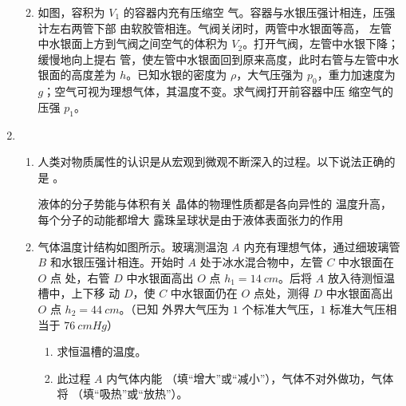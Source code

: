 \begin{enumerate}
\begin{enumerate}

\item 
如图，容积为 $ V_{1} $ 的容器内充有压缩空
气。容器与水银压强计相连，压强计左右两管下部
由软胶管相连。气阀关闭时，两管中水银面等高，
左管中水银面上方到气阀之间空气的体积为 $ V_{2} $。打开气阀，左管中水银下降；缓慢地向上提右
管，使左管中水银面回到原来高度，此时右管与左管中水银面的高度差为 $ h $。已知水银的密度为
$ \rho $，大气压强为 $ p_{0} $，重力加速度为 $ g $；空气可视为理想气体，其温度不变。求气阀打开前容器中压
缩空气的压强 $ p_{1} $。
\begin{figure}[h!]
	\flushright
	
\end{figure}


	
\end{enumerate}

\item 
{}
\begin{enumerate}
	\item
人类对物质属性的认识是从宏观到微观不断深入的过程。以下说法正确的是 \underlinegap 。	

\fourchoices
{液体的分子势能与体积有关}
{晶体的物理性质都是各向异性的}
{温度升高，每个分子的动能都增大}
{露珠呈球状是由于液体表面张力的作用}


\item 
气体温度计结构如图所示。玻璃测温泡 $ A $ 内充有理想气体，通过细玻璃管 $ B $
和水银压强计相连。开始时 $ A $ 处于冰水混合物中，左管 $ C $ 中水银面在 $ O $ 点
处，右管 $ D $ 中水银面高出 $ O $ 点 $ h_{1} =14 \ cm $。后将 $ A $ 放入待测恒温槽中，上下移
动 $ D $，使 $ C $ 中水银面仍在 $ O $ 点处，测得 $ D $ 中水银面高出 $ O $ 点 $ h_{2} =44 \ cm $。（已知
外界大气压为 $ 1 $ 个标准大气压，$ 1 $ 标准大气压相当于 $ 76 \ cm Hg $）
\begin{enumerate}
	\item
求恒温槽的温度。
\item 
此过程 $ A $ 内气体内能
 \underlinegap 
（填“增大”或“减小”），气体不对外做功，气体将
 \underlinegap 
（填“吸热”或“放热”）。
\end{enumerate}
\begin{figure}[h!]
	\flushright
	
\end{figure}


\end{enumerate}
\end{enumerate}
